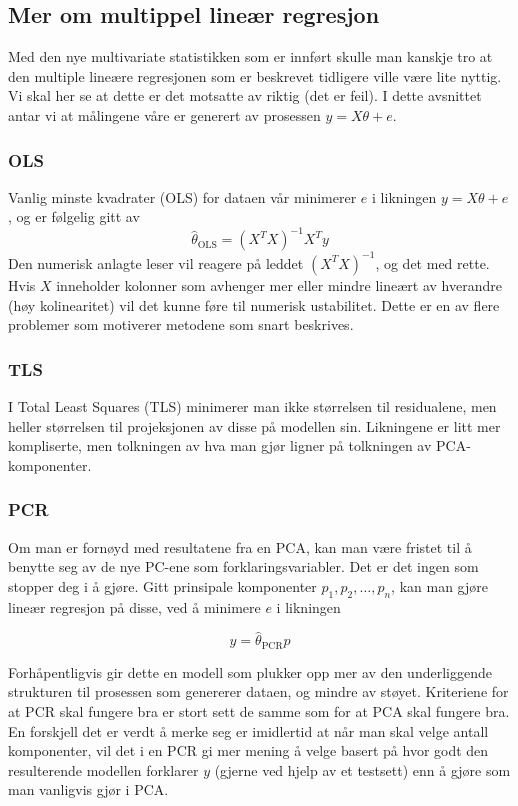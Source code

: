 \subsection{Mer om multippel lineær regresjon}
Med den nye multivariate statistikken som er innført skulle man kanskje tro at den multiple lineære regresjonen som er beskrevet tidligere ville være lite nyttig. Vi skal her se at dette er det motsatte av riktig (det er feil). I dette avsnittet antar vi at målingene våre er generert av prosessen $y = X \theta + e$.

\subsubsection{OLS}
Vanlig minste kvadrater (OLS) for dataen vår minimerer $e$ i likningen $y = X \theta + e$, og er følgelig gitt av
\begin{equation}
	\hat{\theta}_{\textrm{OLS}} = (X^T X)^{-1} X^T y
\end{equation}
Den numerisk anlagte leser vil reagere på leddet $(X^T X)^{-1}$, og det med rette. Hvis $X$ inneholder kolonner som avhenger mer eller mindre lineært av hverandre (høy kolinearitet) vil det kunne føre til numerisk ustabilitet. Dette er en av flere problemer som motiverer metodene som snart beskrives.

\subsubsection{TLS}
I Total Least Squares (TLS) minimerer man ikke størrelsen til residualene, men heller størrelsen til projeksjonen av disse på modellen sin. Likningene er litt mer kompliserte, men tolkningen av hva man gjør ligner på tolkningen av PCA-komponenter.

\subsubsection{PCR}
Om man er fornøyd med resultatene fra en PCA, kan man være fristet til å benytte seg av de nye PC-ene som forklaringsvariabler. Det er det ingen som stopper deg i å gjøre. Gitt prinsipale komponenter $p_1, p_2, \dots, p_n$, kan man gjøre lineær regresjon på disse, ved å minimere $e$ i likningen

\begin{equation}
	y = \hat{\theta}_{\textrm{PCR}} p
\end{equation}

Forhåpentligvis gir dette en modell som plukker opp mer av den underliggende strukturen til prosessen som genererer dataen, og mindre av støyet. Kriteriene for at PCR skal fungere bra er stort sett de samme som for at PCA skal fungere bra. En forskjell det er verdt å merke seg er imidlertid at når man skal velge antall komponenter, vil det i en PCR gi mer mening å velge basert på hvor godt den resulterende modellen forklarer $y$ (gjerne ved hjelp av et testsett) enn å gjøre som man vanligvis gjør i PCA.

